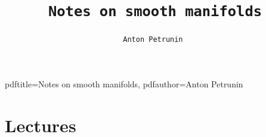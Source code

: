 \documentclass[twoside]{book}
\begin{document}

\hypersetup
{
pdftitle={Notes on smooth manifolds},
pdfauthor={Anton Petrunin}
}

\title{\tt Notes on smooth manifolds}

\author{\tt Anton Petrunin }

\date{}

\maketitle

\thispagestyle{empty}

\chapter*{Lectures}
\end{document}
